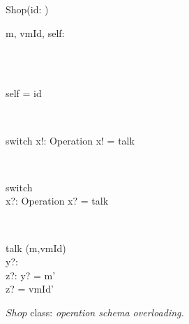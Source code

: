 \begin{figure}[H]
\centering
\begin{class}{Shop(id: \integer)}
\\
\begin{state}
m, vmId, self: \integer
\end{state} 
\\
\begin{init}
\\self = id
\end{init} 
\\
\begin{op}{switch}
x!: Operation
\ST
x! = talk
\end{op}
\\
\begin{op}{switch}
\\x?: Operation
\ST
x? = talk
\end{op}
\\
\begin{op}{talk}
\Delta (m,vmId)
\\y?: \integer
\\z?: \integer
\ST
y? = m'
\\z? = vmId'
\end{op}
\end{class}
\caption{$Shop$ class: \textit{operation schema overloading.}}
\label{fig_oz_overloaded_operation_shop}
\end{figure}
